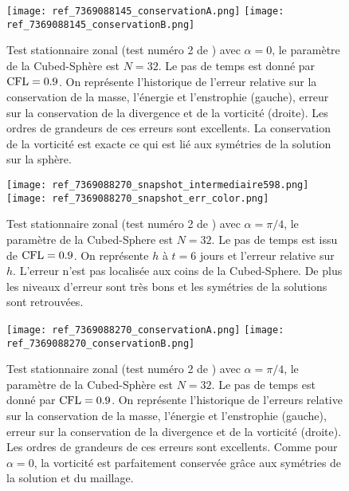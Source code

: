 \begin{figure}[htbp]
\begin{center}
\texttt{[image: ref\_7369088145\_conservationA.png]}
\texttt{[image: ref\_7369088145\_conservationB.png]}
\end{center}
\caption{Test stationnaire zonal (test numéro 2 de \cite{Williamson1992}) avec $\alpha=0$, le paramètre de la Cubed-Sphère est $N=32$. Le pas de temps est donné par $\text{CFL}=0.9$. On représente l'historique de l'erreur relative sur la conservation de la masse, l'énergie et l'enstrophie (gauche), erreur sur la conservation de la divergence et de la vorticité (droite). Les ordres de grandeurs de ces erreurs sont excellents. La conservation de la vorticité est exacte ce qui est lié aux symétries de la solution sur la sphère.}
\label{fig: williamson 2 conservation alpha=0}
\end{figure}

\begin{figure}[htbp]
\begin{center}
\texttt{[image: ref\_7369088270\_snapshot\_intermediaire598.png]}\\
\texttt{[image: ref\_7369088270\_snapshot\_err\_color.png]}
\end{center}
\caption{Test stationnaire zonal (test numéro 2 de \cite{Williamson1992}) avec $\alpha=\pi/4$, le paramètre de la Cubed-Sphere est $N=32$. Le pas de temps est issu de $\text{CFL}=0.9$. On représente $h$ à $t=6$ jours et l'erreur relative sur $h$. L'erreur n'est pas localisée aux coins de la Cubed-Sphere. De plus les niveaux d'erreur sont très bons et les symétries de la solutions sont retrouvées.}
\label{fig: williamson 2 space alpha=pi/4}
\end{figure}

\begin{figure}[htbp]
\begin{center}
\texttt{[image: ref\_7369088270\_conservationA.png]}
\texttt{[image: ref\_7369088270\_conservationB.png]}
\end{center}
\caption{Test stationnaire zonal (test numéro 2 de \cite{Williamson1992}) avec $\alpha=\pi/4$, le paramètre de la Cubed-Sphère est $N=32$. Le pas de temps est donné par $\text{CFL}=0.9$. On représente l'historique de l'erreurs relative sur la conservation de la masse, l'énergie et l'enstrophie (gauche), erreur sur la conservation de la divergence et de la vorticité (droite). Les ordres de grandeurs de ces erreurs sont excellents. Comme pour $\alpha = 0$, la vorticité est parfaitement conservée grâce aux symétries de la solution et du maillage.}
\label{fig: williamson 2 conservation alpha=pi/4}
\end{figure}

